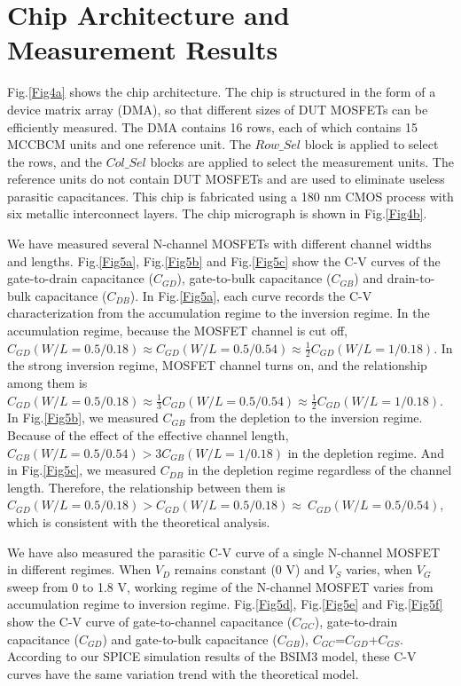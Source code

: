 \documentclass[journal]{IEEEtran}
\begin{document}
\section{Chip Architecture and Measurement Results}
 
Fig.\ref{Fig4a} shows the chip architecture. The chip is structured in the form of a device matrix array (DMA), so that different sizes of DUT MOSFETs can be efficiently measured. The DMA contains 16 rows, each of which contains 15 MCCBCM units and one reference unit. The $Row\_Sel$ block is applied to select the rows, and the $Col\_Sel$ blocks are applied to select the measurement units. The reference units do not contain DUT MOSFETs and are used to eliminate useless parasitic capacitances. This chip is fabricated using a 180 nm CMOS process with six metallic interconnect layers. The chip micrograph is shown in Fig.\ref{Fig4b}.

We have measured several N-channel MOSFETs with different channel widths and lengths. Fig.\ref{Fig5a}, Fig.\ref{Fig5b} and Fig.\ref{Fig5c} show the C-V curves of the gate-to-drain capacitance ($C_{GD}$), gate-to-bulk capacitance ($C_{GB}$) and drain-to-bulk capacitance ($C_{DB}$). In Fig.\ref{Fig5a}, each curve records the C-V characterization from the accumulation regime to the inversion regime. In the accumulation regime, because the MOSFET channel is cut off, $C_{GD}(W/L=0.5/0.18) \approx C_{GD}(W/L=0.5/0.54) \approx \frac{1}{2} C_{GD}(W/L=1/0.18)$. In the strong inversion regime, MOSFET channel turns on, and the relationship among them is $C_{GD}(W/L=0.5/0.18) \approx \frac{1}{3} C_{GD}(W/L=0.5/0.54) \approx \frac{1}{2} C_{GD}(W/L=1/0.18)$. In Fig.\ref{Fig5b}, we measured $C_{GB}$ from the depletion to the inversion regime. Because of the effect of the effective channel length, $C_{GB}(W/L=0.5/0.54)>3C_{GB}(W/L=1/0.18)$ in the depletion regime. And in Fig.\ref{Fig5c}, we measured $C_{DB}$ in the depletion regime regardless of the channel length. Therefore, the relationship between them is $C_{GD}(W/L=0.5/0.18)>C_{GD}(W/L=0.5/0.18) \approx \ C_{GD}(W/L=0.5/0.54)$, which is consistent with the theoretical analysis. 

We have also measured the parasitic C-V curve of a single N-channel MOSFET in different regimes. When $V_{D}$ remains constant (0 V) and $V_{S}$ varies, when $V_{G}$ sweep from 0 to 1.8 V, working regime of the N-channel MOSFET varies from accumulation regime to inversion regime. Fig.\ref{Fig5d}, Fig.\ref{Fig5e} and Fig.\ref{Fig5f} show the C-V curve of gate-to-channel capacitance ($C_{GC}$), gate-to-drain capacitance ($C_{GD}$) and gate-to-bulk capacitance ($C_{GB}$), $C_{GC}$=$C_{GD}$+$C_{GS}$. According to our SPICE simulation results of the BSIM3 model, these C-V curves have the same variation trend with the theoretical model. 
\end{document}
